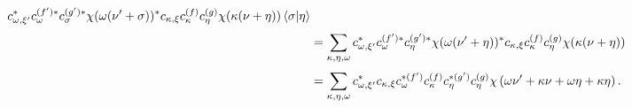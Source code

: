 \documentclass[a4paper]{article}
\begin{document}
\begin{align}
    c_{\omega,\xi'}^{*} 
    c_{\omega}^{(f')*}
    c_{\sigma}^{(g')*}
    \chi(\omega(\nu'+\sigma))^{*}
    c_{\kappa,\xi} 
    c_{\kappa}^{(f)}
    c_{\eta}^{(g)}
    \chi(\kappa(\nu+\eta))
    \braket{\sigma|\eta} \\
    &= 
    \sum_{\kappa,\eta,\omega}^{} 
    c_{\omega,\xi'}^{*} 
    c_{\omega}^{(f')*}
    c_{\eta}^{(g')*}
    \chi(\omega(\nu'+\eta))^{*}
    c_{\kappa,\xi} 
    c_{\kappa}^{(f)}
    c_{\eta}^{(g)}
    \chi(\kappa(\nu+\eta)) \\
    &= \sum_{\kappa,\eta,\omega}^{} 
    c_{\omega,\xi'}^{*} 
    c_{\kappa,\xi} 
    c_{\omega}^{*(f')}
    c_{\kappa}^{(f)}
    c_{\eta}^{*(g')}
    c_{\eta}^{(g)}
    \chi\left( \omega\nu' + \kappa\nu + \omega\eta +
    \kappa\eta \right). 
  \end{align}
\end{document}
